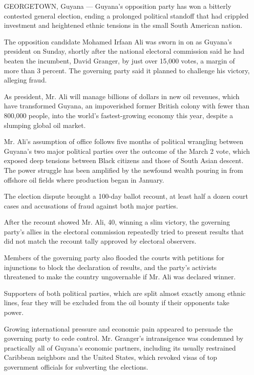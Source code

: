 GEORGETOWN, Guyana --- Guyana's opposition party has won a bitterly
contested general election, ending a prolonged political standoff that
had crippled investment and heightened ethnic tensions in the small
South American nation.

The opposition candidate Mohamed Irfaan Ali was sworn in on as Guyana's
president on Sunday, shortly after the national electoral commission
said he had beaten the incumbent, David Granger, by just over 15,000
votes, a margin of more than 3 percent. The governing party said it
planned to challenge his victory, alleging fraud.

As president, Mr. Ali will manage billions of dollars in new oil
revenues, which have transformed Guyana, an impoverished former British
colony with fewer than 800,000 people, into the world's fastest-growing
economy this year, despite a slumping global oil market.

Mr. Ali's assumption of office follows five months of political
wrangling between Guyana's two major political parties over the outcome
of the March 2 vote, which exposed deep tensions between Black citizens
and those of South Asian descent. The power struggle has been amplified
by the newfound wealth pouring in from offshore oil fields where
production began in January.

The election dispute brought a 100-day ballot recount, at least half a
dozen court cases and accusations of fraud against both major parties.

After the recount showed Mr. Ali, 40, winning a slim victory, the
governing party's allies in the electoral commission repeatedly tried to
present results that did not match the recount tally approved by
electoral observers.

Members of the governing party also flooded the courts with petitions
for injunctions to block the declaration of results, and the party's
activists threatened to make the country ungovernable if Mr. Ali was
declared winner.

Supporters of both political parties, which are split almost exactly
among ethnic lines, fear they will be excluded from the oil bounty if
their opponents take power.

Growing international pressure and economic pain appeared to persuade
the governing party to cede control. Mr. Granger's intransigence was
condemned by practically all of Guyana's economic partners, including
its usually restrained Caribbean neighbors and the United States, which
revoked visas of top government officials for subverting the elections.

